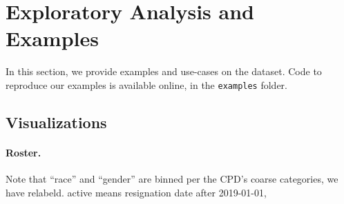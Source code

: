 
\section{Exploratory Analysis and Examples} \label{sec:analysis}

In this section, we provide examples and use-cases on the dataset. Code to
reproduce our examples is available online, in the \texttt{examples} folder.

\subsection{Visualizations}

\paragraph{Roster.}
Note that ``race'' and ``gender'' are binned per the CPD's coarse categories, we have relabeld.
active means resignation date after 2019-01-01, 

